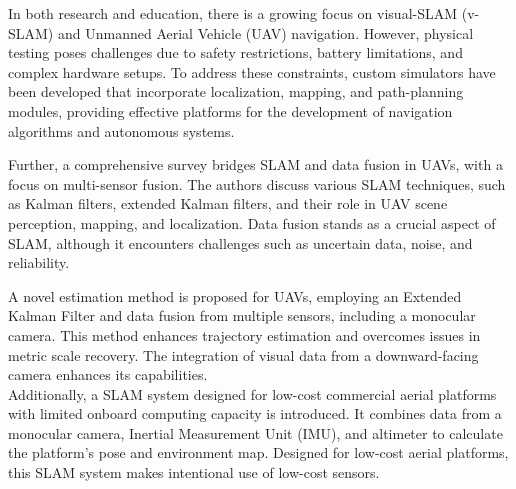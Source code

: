 \documentclass[preprint,12pt]{elsarticle}
\begin{document}
In both research and education, there is a growing focus on visual-SLAM (v-SLAM) and Unmanned Aerial Vehicle (UAV) navigation. However, physical testing poses challenges due to safety restrictions, battery limitations, and complex hardware setups. To address these constraints, custom simulators have been developed that incorporate localization, mapping, and path-planning modules, providing effective platforms for the development of navigation algorithms and autonomous systems\cite{zhou2018routing}.

Further, a comprehensive survey bridges SLAM and data fusion in UAVs, with a focus on multi-sensor fusion. The authors discuss various SLAM techniques, such as Kalman filters, extended Kalman filters, and their role in UAV scene perception, mapping, and localization\cite{wang2018survey}. Data fusion stands as a crucial aspect of SLAM, although it encounters challenges such as uncertain data, noise, and reliability\cite{kegeleirs2021swarm}.

A novel estimation method is proposed for UAVs, employing an Extended Kalman Filter and data fusion from multiple sensors, including a monocular camera. This method enhances trajectory estimation and overcomes issues in metric scale recovery. The integration of visual data from a downward-facing camera enhances its capabilities\cite{chen2022end}.\\ Additionally, a SLAM system designed for low-cost commercial aerial platforms with limited onboard computing capacity is introduced. It combines data from a monocular camera, Inertial Measurement Unit (IMU), and altimeter to calculate the platform's pose and environment map. Designed for low-cost aerial platforms, this SLAM system makes intentional use of low-cost sensors\cite{gupta2022slam}.
\end{document}
